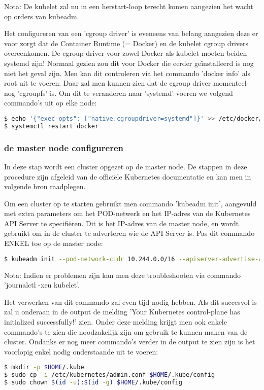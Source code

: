Nota: De kubelet zal nu in een herstart-loop terecht komen aangezien het wacht op orders van kubeadm.

Het configureren van een 'cgroup driver' is eveneens van belang aangezien deze er voor zorgt dat de Container Runtime (= Docker) en de kubelet cgroup drivers overeenkomen. De cgroup driver voor zowel Docker als kubelet moeten beiden systemd zijn! 
Normaal gezien zou dit voor Docker die eerder geïnstalleerd is nog niet het geval zijn. Men kan dit controleren via het commando 'docker info' als root uit te voeren. Daar zal men kunnen zien dat de cgroup driver momenteel nog 'cgroupfs' is. Om dit te veranderen naar 'systemd' voeren we volgend commando's uit op elke node: 
\begin{lstlisting}[language=bash]
$ echo '{"exec-opts": ["native.cgroupdriver=systemd"]}' >> /etc/docker/daemon.json`
$ systemctl restart docker
\end{lstlisting}

\subsubsection{de master node configureren}

In deze stap wordt een cluster opgezet op de master node. De stappen in deze procedure zijn afgeleid van de officiële Kubernetes documentatie en kan men in volgende bron raadplegen. \autocite{Kubernetes2022b}

Om een cluster op te starten gebruikt men commando 'kubeadm init', aangevuld met extra parameters om het POD-netwerk en het IP-adres van de Kubernetes API Server te specifiëren. Dit is het IP-adres van de master node, en wordt gebruikt om in de cluster te adverteren wie de API Server is. Pas dit commando ENKEL toe op de master node: 
\begin{lstlisting}[language=bash]
$ kubeadm init --pod-network-cidr 10.244.0.0/16 --apiserver-advertise-address=[IP-master node]
\end{lstlisting}

Nota: Indien er problemen zijn kan men deze troubleshooten via commando 'journalctl -xeu kubelet'. 

Het verwerken van dit commando zal even tijd nodig hebben. Als dit succesvol is zal u onderaan in de output de melding 'Your Kubernetes control-plane has initialized successfully!' zien. Onder deze melding krijgt men ook enkele commando's te zien die noodzakelijk zijn om gebruik te kunnen maken van de cluster. Ondanks er nog meer commando's verder in de output te zien zijn is het voorlopig enkel nodig onderstaande uit te voeren:
\begin{lstlisting}[language=bash]
$ mkdir -p $HOME/.kube
$ sudo cp -i /etc/kubernetes/admin.conf $HOME/.kube/config
$ sudo chown $(id -u):$(id -g) $HOME/.kube/config
\end{lstlisting}


